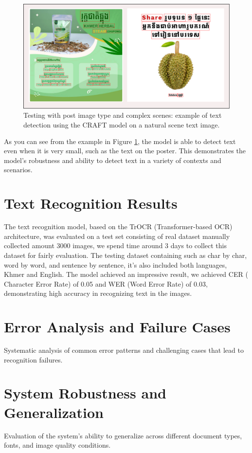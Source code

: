 \begin{figure}[ht]
    \centering
    \includegraphics[width=1\textwidth]{figures/image_detection_craft_02.png}
    \caption{Testing with post image type and complex scenes: example of text detection using the CRAFT 
    model on a natural scene text image.}
    \label{fig:detection-craft-post}
\end{figure}

As you can see from the example in Figure \ref{fig:detection-craft-post}, 
the model is able to detect text even when it is very small, such as the text on the poster. 
This demonstrates the model's robustness and ability to detect text in a variety of contexts and scenarios.
\section{Text Recognition Results}
\label{sec:recognition-results}
The text recognition model, based on the TrOCR (Transformer-based OCR) architecture, was
evaluated on a test set consisting of real dataset manually collected amount 3000 images, we
spend time around 3 days to collect this dataset for fairly evaluation. The testing dataset
containing such as char by char, word by word, and sentence by sentence, it's also included
both languages, Khmer and English. The model achieved an impressive result, we achieved CER
( Character Error Rate) of 0.05 and WER (Word Error Rate) of 0.03, demonstrating high accuracy
in recognizing text in the images.
\section{Error Analysis and Failure Cases}
\label{sec:error-analysis}
Systematic analysis of common error patterns and challenging cases that lead to recognition failures.

\section{System Robustness and Generalization}
\label{sec:robustness}
Evaluation of the system's ability to generalize across different document types, fonts, and image quality conditions.
